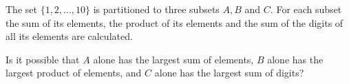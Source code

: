 The set $\{1, 2, . . . , 10\}$ is partitioned to three subsets $A, B$ and $C.$ For each subset the sum of its elements, the product of its elements and the sum of the digits of all its elements are calculated.

Is it possible that $A$ alone has the largest sum of elements, $B$ alone has the largest product of elements, and $C$ alone has the largest sum of digits?